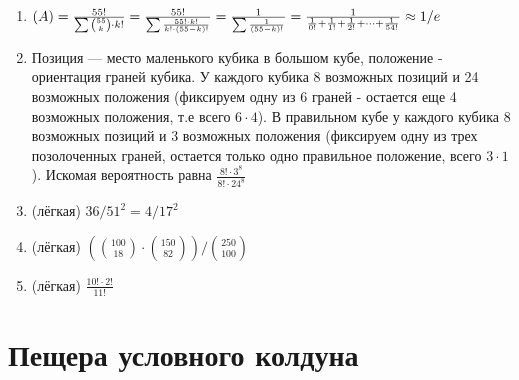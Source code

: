 \documentclass[a4paper,12pt]{article}
\let\P\relax
\DeclareMathOperator{\P}{\mathbb{P}}
\begin{document}
\begin{enumerate}
\item
$\P(A) = \frac{55!}{\sum\binom{55}{k}\cdot k!} = \frac{55!}{\sum\frac{55!\cdot k!}{k!\cdot (55-k)!}}=\frac{1}{\sum \frac{1}{(55-k)!}} = \frac{1}{\frac{1}{0!}+\frac{1}{1!}+\frac{1}{2!}+\dots+\frac{1}{54!}}\approx1/e$


\item
Позиция — место маленького кубика в большом кубе, положение - ориентация граней кубика. У каждого кубика 8 возможных позиций и 24 возможных положения (фиксируем одну из 6 граней - остается еще 4 возможных положения, т.е всего $6\cdot4$). В правильном кубе у каждого кубика 8 возможных позиций и 3 возможных положения (фиксируем одну из трех позолоченных граней, остается только одно правильное положение, всего $3\cdot1$). Искомая вероятность равна $\frac{8!\cdot3^8}{8!\cdot24^8}$
\item (лёгкая)
$36/51^2 = 4/17^2$
\item (лёгкая)
$(\binom{100}{18}\cdot\binom{150}{82})/\binom{250}{100}$
\item (лёгкая)
$\frac{10!\cdot2!}{11!}$
\end{enumerate}
\newpage

\section{Пещера условного колдуна} %
\end{document}

